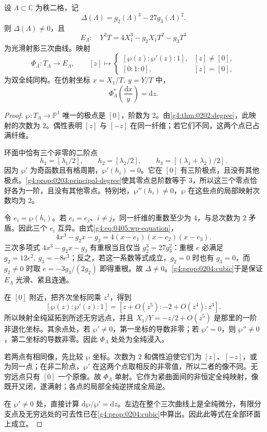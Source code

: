 \begin{theorem}\label{g4:thm:0405:cubic-uniformization}
	设 \(\Lambda\subset\mathbb C\) 为秩二格，记
	\[
		\Delta(\Lambda)=g_2(\Lambda)^3-27g_3(\Lambda)^2.
	\]
	则 \(\Delta(\Lambda)\ne0\)，且
	\[
		E_\Lambda:\quad Y^2T=4X_1^3-g_2X_1T^2-g_3T^3
	\]
	为光滑射影三次曲线。映射
	\begin{equation}\label{g4:eq:0405:wp-uniformization}
		\Phi_\Lambda:T_\Lambda\longrightarrow E_\Lambda,\qquad
		[z]\longmapsto
		\begin{cases}
			[\wp(z):\wp'(z):1],&[z]\ne[0],\\
			[0:1:0],&[z]=[0],
		\end{cases}
	\end{equation}
	为双全纯同构。在仿射坐标 \(x=X_1/T,\ y=Y/T\) 中，
	\[
		\Phi_\Lambda^*\left(\frac{\mathrm{d}x}{y}\right)=\mathrm{d}z.
	\]
\end{theorem}
\begin{proof}
	\(\wp:T_\Lambda\to\mathbb P^1\) 唯一的极点是 \([0]\)，阶数为 \(2\)。由\cref{g4:thm:0202:degree}，此映射的次数为 \(2\)。偶性表明 \([z]\) 与 \([-z]\) 在同一纤维；若它们不同，这两个点已占满纤维。

	环面中恰有三个非零的二阶点
	\[
		h_1=[\lambda_1/2],\qquad
		h_2=[\lambda_2/2],\qquad
		h_3=[(\lambda_1+\lambda_2)/2].
	\]
	因为 \(\wp'\) 为奇函数且有格周期，\(\wp'(h_i)=0\)。它在 \([0]\) 有三阶极点，且没有其他极点。\cref{g4:prop:0203:principal-degree}使其零点总阶数等于 \(3\)，所以这三个零点恰好各为一阶，且没有其他零点。特别地，\(\wp''(h_i)\ne0\)，\(\wp\) 在这些点的局部映射次数均为 \(2\)。

	令 \(e_i=\wp(h_i)\)。若 \(e_i=e_j\)、\(i\ne j\)，同一纤维的重数至少为 \(4\)，与总次数为 \(2\) 矛盾。因此三个 \(e_i\) 互异。由式\eqref{g4:eq:0405:wp-equation}，
	\[
		4x^3-g_2x-g_3=4(x-e_1)(x-e_2)(x-e_3).
	\]
	三次多项式 \(4x^3-g_2x-g_3\) 有重根当且仅当 \(g_2^3=27g_3^2\)：重根 \(e\) 必满足 \(g_2=12e^2,\ g_3=-8e^3\)；反之，若这一系数等式成立，\(g_2=0\) 时也有 \(g_3=0\)，而 \(g_2\ne0\) 时取 \(e=-3g_3/(2g_2)\) 即得重根。故 \(\Delta\ne0\)。\cref{g4:prop:0204:cubic}于是保证 \(E_\Lambda\) 光滑、紧且连通。

	在 \([0]\) 附近，把齐次坐标同乘 \(z^3\)，得到
	\[
		[\wp(z):\wp'(z):1]
		=[z+O(z^5):-2+O(z^4):z^3].
	\]
	所以映射全纯延拓到所述无穷远点，并且 \(X_1/Y=-z/2+O(z^5)\) 是那里的一阶非退化坐标。其余点处，若 \(\wp'\ne0\)，第一坐标的导数非零；若 \(\wp'=0\)，则 \(\wp''\ne0\)，第二坐标的导数非零。因此 \(\Phi_\Lambda\) 处处为全纯浸入。

	若两点有相同像，先比较 \(\wp\) 坐标。次数为 \(2\) 和偶性迫使它们为 \([z]\)、\([-z]\)，或为同一点；在非二阶点，\(\wp'\) 在这两个点取相反的非零值，所以二者的像不同。无穷远点只有 \([0]\) 一个原像。故 \(\Phi_\Lambda\) 单射。它作为紧曲面间的非恒定全纯映射，像既开又闭，遂满射；各点的局部全纯逆拼成全局逆。

	在 \(\wp'\ne0\) 处，直接计算
	\(\mathrm{d}\wp/\wp'=\mathrm{d}z\)。左边在整个三次曲线上是全纯微分，有限分支点及无穷远处的可去性已在\cref{g4:prop:0204:cubic}中算出。因此此等式在全部环面上成立。
\end{proof}


